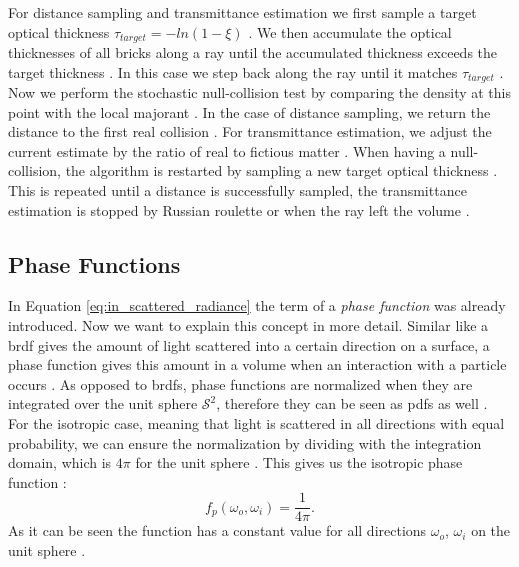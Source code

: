 For distance sampling and transmittance estimation we first sample a target optical thickness $\tau_{target}=-ln(1-\xi)$ \cite{brick_grid}.
We then accumulate the optical thicknesses of all bricks along a ray until the accumulated thickness exceeds the target thickness \cite{brick_grid}.
In this case we step back along the ray until it matches $\tau_{target}$ \cite{brick_grid}.
Now we perform the stochastic null-collision test by comparing the density at this point with the local majorant \cite{brick_grid}.
In the case of distance sampling, we return the distance to the first real collision \cite{brick_grid}.
For transmittance estimation, we adjust the current estimate by the ratio of real to fictious matter \cite{brick_grid}.
When having a null-collision, the algorithm is restarted by sampling a new target optical thickness \cite{brick_grid}.
This is repeated until a distance is successfully sampled, the transmittance estimation is stopped by Russian roulette or when the ray left the volume \cite{brick_grid}.

\subsection{Phase Functions}
\label{subsec:phase_function}
In Equation \ref{eq:in_scattered_radiance} the term of a \textit{phase function} was already introduced.
Now we want to explain this concept in more detail.
Similar like a \acs{brdf} gives the amount of light scattered into a certain direction on a surface, a phase function gives this amount in a volume when an interaction with a particle occurs \cite{novak_overview}.
As opposed to \acsp{brdf}, phase functions are normalized when they are integrated over the unit sphere $\mathcal{S}^2$, therefore they can be seen as \acsp{pdf} as well \cite{pbr}.
For the isotropic case, meaning that light is scattered in all directions with equal probability, we can ensure the normalization by dividing with the integration domain, which is $4\pi$ for the unit sphere \cite{pbr}.
This gives us the isotropic phase function \cite{novak_overview}:
\begin{equation*}
    f_p(\omega_o, \omega_i)=\frac{1}{4\pi}.
\end{equation*}
As it can be seen the function has a constant value for all directions $\omega_o$, $\omega_i$ on the unit sphere \cite{novak_overview}.

